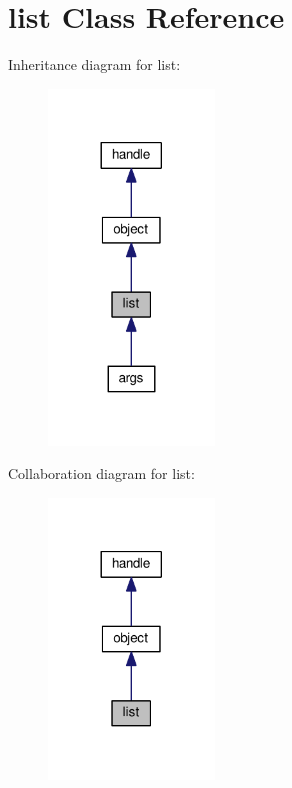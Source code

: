 \hypertarget{classlist}{}\section{list Class Reference}
\label{classlist}


Inheritance diagram for list\+:
\nopagebreak
\begin{figure}[H]
\begin{center}
\leavevmode
\includegraphics[width=125pt]{classlist__inherit__graph}
\end{center}
\end{figure}


Collaboration diagram for list\+:
\nopagebreak
\begin{figure}[H]
\begin{center}
\leavevmode
\includegraphics[width=125pt]{classlist__coll__graph}
\end{center}
\end{figure}
